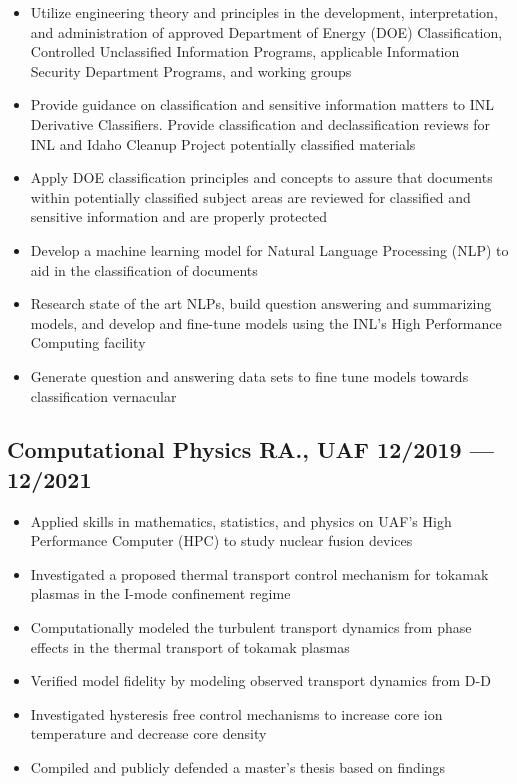 \documentclass[letterpaper,11pt]{article}
\begin{document}
\begin{itemize}
    \setlength{\itemsep}{-.5pt}
    \item  Utilize engineering theory and principles in the development, interpretation, and administration of approved Department of Energy (DOE) Classification, Controlled Unclassified Information Programs, applicable Information
    Security Department Programs, and working groups
    \item  Provide guidance on classification and sensitive information matters to INL Derivative Classifiers. Provide classification and declassification reviews for INL and Idaho Cleanup Project potentially classified materials
    \item  Apply DOE classification principles and concepts to assure that documents within potentially classified subject areas are reviewed for classified and sensitive information and are properly protected
    \item  Develop a machine learning model for Natural Language Processing (NLP) to aid in the classification of documents
    \item  Research state of the art NLPs, build question answering and summarizing models, and develop and fine-tune models using the INL’s High Performance Computing facility
    \item  Generate question and answering data sets to fine tune models towards classification vernacular
\end{itemize}

\subsection*{{\color{cvblue}Computational Physics RA., UAF } \hfill 12/2019 --- 12/2021} 
    \begin{itemize}
    \setlength{\itemsep}{-.5pt}
    \item Applied skills in mathematics, statistics, and physics on UAF's High Performance Computer (HPC) to study nuclear fusion devices  
    \item Investigated a proposed thermal transport control mechanism for tokamak plasmas in the I-mode confinement regime 
    \item Computationally modeled the turbulent transport dynamics from phase effects in the thermal transport of tokamak plasmas
    \item Verified model fidelity by modeling observed transport dynamics from D-D
    \item Investigated hysteresis free control mechanisms to increase core ion temperature and decrease core density 
    \item Compiled and publicly defended a master's thesis based on findings
\end{itemize}
\end{document}
